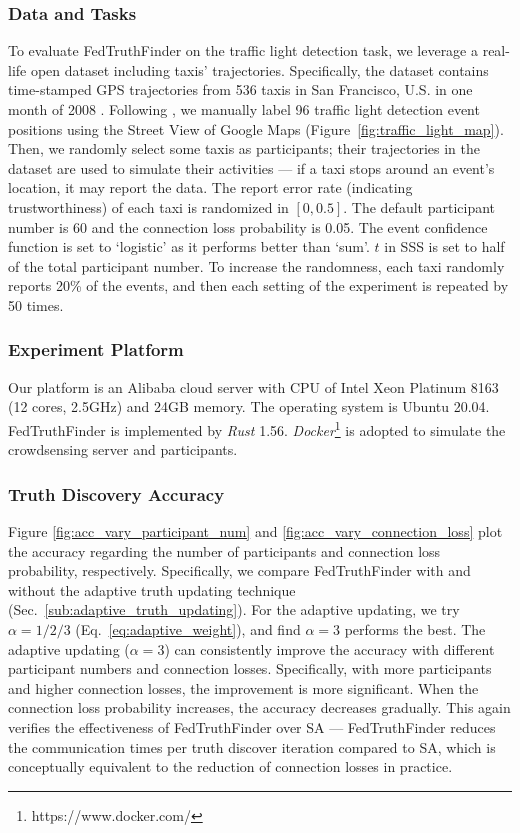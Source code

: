 \documentclass[11pt]{article}
\begin{document}
\subsubsection{Data and Tasks} To evaluate FedTruthFinder on the traffic light detection task, we leverage a real-life open dataset including taxis' trajectories. Specifically, the dataset contains time-stamped GPS trajectories from 536 taxis in San Francisco, U.S. in one month of 2008 \cite{Leye-epflmobility}. Following \cite{Leye-ouyang2015truth}, we manually label 96 traffic light detection event positions using the Street View of Google Maps (Figure~\ref{fig:traffic_light_map}). Then, we randomly select some taxis as participants; their trajectories in the dataset are used to simulate their activities --- if a taxi stops around an event's location, it may report the data. The report error rate (indicating trustworthiness) of each taxi is randomized in $[0,0.5]$. The default participant number is 60 and the connection loss probability is 0.05. The event confidence function is set to `logistic' as it performs better than `sum'. $t$ in SSS is set to half of the total participant number. To increase the randomness, each taxi randomly reports 20\% of the events, and then each setting of the experiment is repeated by 50 times.

\subsubsection{Experiment Platform} Our platform is an Alibaba cloud server with CPU of Intel Xeon Platinum 8163 (12 cores, 2.5GHz) and 24GB memory. The operating system is Ubuntu 20.04. FedTruthFinder is implemented by \textit{Rust} 1.56. \textit{Docker}\footnote{https://www.docker.com/} is adopted to simulate the crowdsensing server and participants.


\subsubsection{Truth Discovery Accuracy} Figure \ref{fig:acc_vary_participant_num} and \ref{fig:acc_vary_connection_loss} plot the accuracy regarding the number of participants and connection loss probability, respectively. Specifically, we compare FedTruthFinder with and without the adaptive truth updating technique (Sec.~\ref{sub:adaptive_truth_updating}). For the adaptive updating, we try $\alpha=1/2/3$ (Eq.~\ref{eq:adaptive_weight}), and find $\alpha=3$ performs the best. The adaptive updating ($\alpha=3$) can consistently improve the accuracy with different participant numbers and connection losses. Specifically, with more participants and higher connection losses, the improvement is more significant. When the connection loss probability increases, the accuracy decreases gradually. This again verifies the effectiveness of FedTruthFinder over SA \cite{Leye-Xu2019EfficientAP} --- FedTruthFinder reduces the communication times per truth discover iteration compared to SA, which is conceptually equivalent to the reduction of connection losses in practice.
\end{document}
